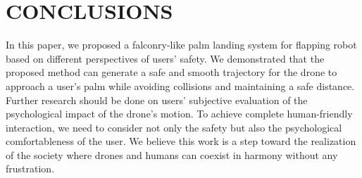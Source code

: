 \section{CONCLUSIONS}

In this paper, we proposed a falconry-like palm landing system for flapping robot based on different perspectives of users' safety.
We demonstrated that the proposed method can generate a safe and smooth trajectory for the drone to approach a user's palm while avoiding collisions and maintaining a safe distance.
Further research should be done on users' subjective evaluation of the psychological impact of the drone's motion.
To achieve complete human-friendly interaction, we need to consider not only the safety but also the psychological comfortableness of the user.
We believe this work is a step toward the realization of the society where drones and humans can coexist in harmony without any frustration.